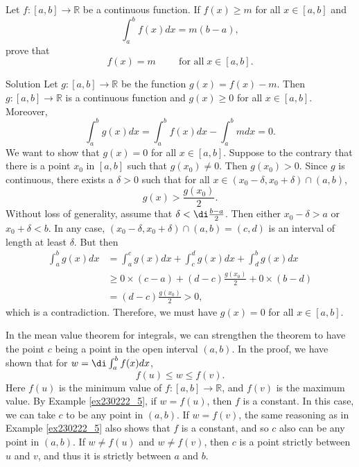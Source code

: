 \begin{example}[label=ex230222_5]{}
Let $f:[a,b]\to\mathbb{R}$ be a continuous function. If  $f(x)\geq m$ for all $x\in [a,b]$ and 
\[\int_a^b f(x)dx=m(b-a),\]prove that
\[f(x)=m\hspace{1cm}\text{for all}\;x\in [a,b].\]
\end{example}
\begin{solution}{Solution}
Let $g:[a,b]\to\mathbb{R}$ be the function $g(x)=f(x)-m$. Then $g:[a,b]\to\mathbb{R}$ is a continuous function and $g(x)\geq 0$ for all $x\in [a,b]$. Moreover,
\[\int_a^b g(x)dx=\int_a^b f(x)dx-\int_a^b mdx=0.\]
We want to show that $g(x)=0$ for all $x\in [a,b]$. Suppose to the contrary that there is a point $x_0$ in $[a,b]$ such that $g(x_0)\neq 0$. Then $g(x_0)>0$. Since $g$ is continuous, there exists a $\delta>0$ such that for all $x\in (x_0-\delta,x_0+\delta)\cap (a,b)$, 
\[g(x)>\frac{g(x_0)}{2}.\]\bs
Without loss of generality, assume that $\delta<\di\frac{b-a}{2}$. Then either $x_0-\delta>a$ or $x_0+\delta<b$. In any case, $(x_0-\delta,x_0+\delta)\cap (a,b)=(c,d)$ is an interval of length at least $\delta$. But then
\begin{align*}\int_a^b g(x)dx&=\int_{a}^cg(x)dx+\int_c^dg(x)dx+\int_d^bg(x)dx\\&\geq 0\times (c-a)+(d-c)\frac{g(x_0)}{2}+0\times (b-d)\\&=(d-c)\frac{g(x_0)}{2}>0,\end{align*}
which is a contradiction. Therefore, we must have $g(x)=0$ for all $x\in [a,b]$.
\end{solution}

\begin{remark}{}
In the mean value theorem for integrals, we can strengthen the theorem to have the point $c$  being a point in the open interval $(a,b)$. In the proof, we have shown that for $w=\di\int_a^b f(x)dx$,
 \[f(u)\leq w\leq f(v).\] Here $f(u)$ is the minimum value of $f:[a,b]\to\mathbb{R}$, and $f(v)$ is the maximum value. By Example \ref{ex230222_5}, if $w=f(u)$, then $f$ is a constant. In this case, we can take $c$ to be any point in $(a,b)$. If $w=f(v)$, the same reasoning as in Example \ref{ex230222_5} also shows that $f$ is a constant, and so $c$ also can be any point in $(a,b)$. If $w\neq f(u)$ and $w\neq f(v)$, then $c$ is a point strictly between $u$ and $v$, and thus it is strictly between $a$ and $b$.
\end{remark}


